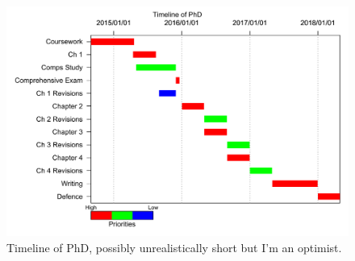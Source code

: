 \documentclass{article}
\begin{document}
\begin{figure}[!h]
\begin{center}
\includegraphics[scale = 0.6]{Images/Gantt.pdf}
\end{center}
\caption{Timeline of PhD, possibly unrealistically short but I'm an optimist.} \label{fig:Gantt}
\end{figure}
\end{document}
